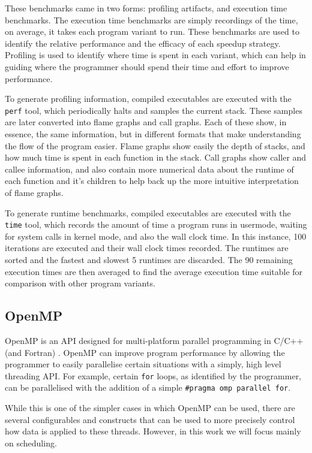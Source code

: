 \documentclass[a4paper]{article}
\begin{document}
    These benchmarks came in two forms: profiling artifacts, and execution time benchmarks. The execution time 
    benchmarks are simply recordings of the time, on average, it takes each program variant to run. These benchmarks
    are used to identify the relative performance and the efficacy of each speedup strategy. Profiling is used to
    identify where time is spent in each variant, which can help in guiding where the programmer should spend their
    time and effort to improve performance.
    
    To generate profiling information, compiled executables are executed with the \texttt{perf} tool, which
    periodically halts and samples the current stack. These samples are later converted into flame graphs and call
    graphs. Each of these show, in essence, the same information, but in different formats that make understanding the
    flow of the program easier. Flame graphs show easily the depth of stacks, and how much time is spent in each
    function in the stack. Call graphs show caller and callee information, and also contain more numerical data about
    the runtime of each function and it's children to help back up the more intuitive interpretation of flame graphs.

    To generate runtime benchmarks, compiled executables are executed with the \texttt{time} tool, which records the
    amount of time a program runs in usermode, waiting for system calls in kernel mode, and also the wall clock time.
    In this instance, 100 iterations are executed and their wall clock times recorded. The runtimes are sorted and
    the fastest and slowest 5 runtimes are discarded. The 90 remaining execution times are then averaged to find the
    average execution time suitable for comparison with other program variants.

        \subsection{OpenMP}
        OpenMP is an API designed for multi-platform parallel programming in C/C++ (and Fortran) \cite{OpenMP}.
        OpenMP can improve program performance by allowing the programmer to easily parallelise certain situations
        with a simply, high level threading API. For example, certain \texttt{for} loops, as identified by the
        programmer, can be parallelised with the addition of a simple \texttt{\#pragma omp parallel for}.

        While this is one of the simpler cases in which OpenMP can be used, there are several configurables and
        constructs that can be used to more precisely control how data is applied to these threads. However, in this
        work we will focus mainly on scheduling.
\end{document}
